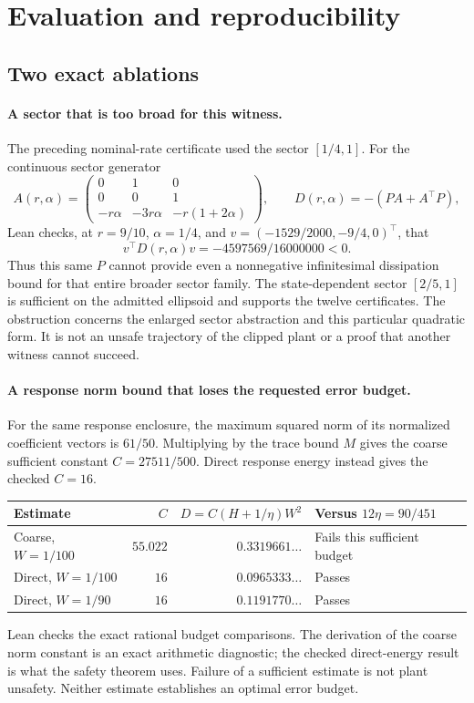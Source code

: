 \documentclass[10pt]{article}
\begin{document}
\section{Evaluation and reproducibility}
\subsection{Two exact ablations}
\paragraph{A sector that is too broad for this witness.}
The preceding nominal-rate certificate used the sector $[1/4,1]$. For the continuous sector generator
\[
 A(r,\alpha)=
 \begin{pmatrix}0&1&0\\0&0&1\\-r\alpha&-3r\alpha&-r(1+2\alpha)\end{pmatrix},
 \qquad D(r,\alpha)=-(PA+A^\top P),
\]
Lean checks, at $r=9/10$, $\alpha=1/4$, and $v=(-1529/2000,-9/4,0)^\top$, that
\[
 v^\top D(r,\alpha)v=-4597569/16000000<0.
\]
Thus this same $P$ cannot provide even a nonnegative infinitesimal dissipation bound for that entire broader sector family. The state-dependent sector $[2/5,1]$ is sufficient on the admitted ellipsoid and supports the twelve certificates. The obstruction concerns the enlarged sector abstraction and this particular quadratic form. It is not an unsafe trajectory of the clipped plant or a proof that another witness cannot succeed.

\paragraph{A response norm bound that loses the requested error budget.}
For the same response enclosure, the maximum squared norm of its normalized coefficient vectors is $61/50$. Multiplying by the trace bound $M$ gives the coarse sufficient constant $C=27511/500$. Direct response energy instead gives the checked $C=16$.
\begin{center}
\small
\begin{tabular}{@{}lrrl@{}}
\toprule
Estimate & $C$ & $D=C(H+1/\eta)W^2$ & Versus $12\eta=90/451$\\\midrule
Coarse, $W=1/100$ & $55.022$ & $0.3319661\ldots$ & Fails this sufficient budget\\
Direct, $W=1/100$ & $16$ & $0.0965333\ldots$ & Passes\\
Direct, $W=1/90$ & $16$ & $0.1191770\ldots$ & Passes\\\bottomrule
\end{tabular}
\end{center}
Lean checks the exact rational budget comparisons. The derivation of the coarse norm constant is an exact arithmetic diagnostic; the checked direct-energy result is what the safety theorem uses. Failure of a sufficient estimate is not plant unsafety. Neither estimate establishes an optimal error budget.
\end{document}
